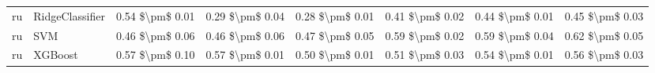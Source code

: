 \begin{tabular}{llllllll}
      ru &                 RidgeClassifier &     0.54 \$\textbackslash pm\$ 0.01 &           0.29 \$\textbackslash pm\$ 0.04 &       0.28 \$\textbackslash pm\$ 0.01 &        0.41 \$\textbackslash pm\$ 0.02 &                         0.44 \$\textbackslash pm\$ 0.01 &     0.45 \$\textbackslash pm\$ 0.03 \\
      ru &                             SVM &     0.46 \$\textbackslash pm\$ 0.06 &           0.46 \$\textbackslash pm\$ 0.06 &       0.47 \$\textbackslash pm\$ 0.05 &        0.59 \$\textbackslash pm\$ 0.02 &                         0.59 \$\textbackslash pm\$ 0.04 &     0.62 \$\textbackslash pm\$ 0.05 \\
      ru &                         XGBoost &     0.57 \$\textbackslash pm\$ 0.10 &           0.57 \$\textbackslash pm\$ 0.01 &       0.50 \$\textbackslash pm\$ 0.01 &        0.51 \$\textbackslash pm\$ 0.03 &                         0.54 \$\textbackslash pm\$ 0.01 &     0.56 \$\textbackslash pm\$ 0.03 \\
\bottomrule
\end{tabular}

